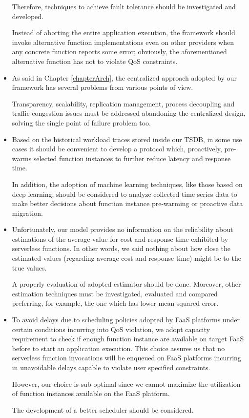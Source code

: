 \documentclass[12pt,a4paper]{report}
\begin{document}
\begin{itemize}
	Therefore, techniques to achieve fault tolerance should be investigated and developed. 
	
	Instead of aborting the entire application execution, the framework should invoke alternative function implementations even on other providers when any concrete function reports some error; obviously, the aforementioned alternative function has not to violate QoS constraints. 

	\item As said in Chapter \ref{chapterArch}, the centralized approach adopted by our framework has several problems from various points of view.
	
	Transparency, scalability, replication management, process decoupling and traffic congestion issues must be addressed abandoning the centralized design, solving the single point of failure problem too.
	
	\item Based on the historical workload traces stored inside our TSDB, in some use cases it should be convenient to develop a protocol which, proactively, pre-warms selected function instances to further reduce latency and response time. 
	
	In addition, the adoption of machine learning techniques, like those based on deep learning, should be considered to analyze collected time series data to make better decisions about function instance pre-warming or proactive data migration.
			
	\item Unfortunately, our model provides no information on the reliability about estimations of the average value for cost and response time exhibited by serverless functions. In other words, we said nothing about how close the estimated values (regarding average cost and response time) might be to the true values. 
	
	A properly evaluation of adopted estimator should be done. Moreover, other estimation techniques must be investigated, evaluated and compared preferring, for example, the one which has lower mean squared error. 

	\item To avoid delays due to scheduling policies adopted by FaaS platforms under certain conditions incurring into QoS violation, we adopt capacity requirement to check if enough function instance are available on target FaaS before to start an application execution. This choice assures us that no serverless function invocations will be enqueued on FaaS platforms incurring in unavoidable delays capable to violate user specified constraints.
	
	However, our choice is sub-optimal since we cannot maximize the utilization of function instances available on the FaaS platform.
	
	The development of a better scheduler should be considered.
	
\end{itemize}




\end{document}
